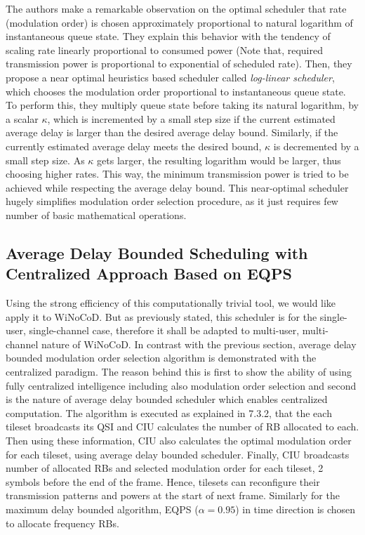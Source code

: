 The authors make a remarkable observation on the optimal scheduler that rate (modulation order) is chosen approximately proportional to natural logarithm of instantaneous queue state. They explain this behavior with the tendency of scaling rate linearly proportional to consumed power (Note that, required transmission power is proportional to exponential of scheduled rate). Then, they propose a near optimal heuristics based scheduler called \textit{log-linear scheduler}, which chooses the modulation order proportional to instantaneous queue state. To perform this, they multiply queue state before taking its natural logarithm, by a scalar $\kappa$, which is incremented by a small step size if the current estimated average delay is larger than the desired average delay bound. Similarly, if the currently estimated average delay meets the desired bound, $\kappa$ is decremented by a small step size. As $\kappa$ gets larger, the resulting logarithm would be larger, thus choosing higher rates. This way, the minimum transmission power is tried to be achieved while respecting the average delay bound. This near-optimal scheduler hugely simplifies modulation order selection procedure, as it just requires few number of basic mathematical operations. 

\subsection{Average Delay Bounded Scheduling with Centralized Approach Based on EQPS}

Using the strong efficiency of this computationally trivial tool, we would like apply it to WiNoCoD. But as previously stated, this scheduler is for the single-user, single-channel case, therefore it shall be adapted to multi-user, multi-channel nature of WiNoCoD. In contrast with the previous section, average delay bounded modulation order selection algorithm is demonstrated with the centralized paradigm. The reason behind this is first to show the ability of using fully centralized intelligence including also modulation order selection and second is the nature of average delay bounded scheduler which enables centralized computation. The algorithm is executed as explained in 7.3.2, that the each tileset broadcasts its QSI and CIU calculates the number of RB allocated to each. Then using these information, CIU also calculates the optimal modulation order for each tileset, using average delay bounded scheduler. Finally, CIU broadcasts number of allocated RBs and selected modulation order for each tileset, 2 symbols before the end of the frame. Hence, tilesets can reconfigure their transmission patterns and powers at the start of next frame. Similarly for the maximum delay bounded algorithm, EQPS ($\alpha = 0.95$) in time direction is chosen to allocate frequency RBs.

